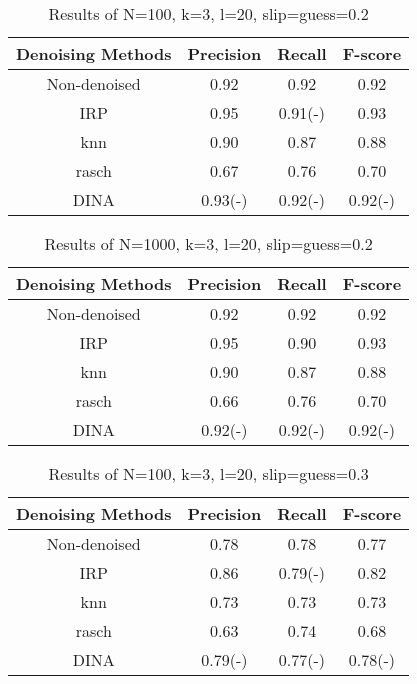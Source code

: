 \documentclass[11pt]{article}
\begin{document}
\begin{table}[!h]
\begin{center}
\begin{tabular}{|c|c|c|c|}
\hline
Denoising Methods & Precision & Recall & F-score\\
\hline
Non-denoised & 0.92 & 0.92 & 0.92  \\
\hline
IRP & 0.95 & 0.91(-) & 0.93 \\
\hline
knn & 0.90 & 0.87 & 0.88 \\
\hline
rasch & 0.67 & 0.76 & 0.70 \\
\hline
DINA & 0.93(-) & 0.92(-) & 0.92(-) \\
\hline
\end{tabular}
\end{center}
\caption{Results of N=100, k=3, l=20, slip=guess=0.2}\label{tab:results9}
\end{table}


\begin{table}[!h]
\begin{center}
\begin{tabular}{|c|c|c|c|}
\hline
Denoising Methods & Precision & Recall & F-score\\
\hline
Non-denoised & 0.92 & 0.92 & 0.92  \\
\hline
IRP & 0.95 & 0.90 & 0.93 \\
\hline
knn & 0.90 & 0.87 & 0.88 \\
\hline
rasch & 0.66 & 0.76 & 0.70 \\
\hline
DINA & 0.92(-) & 0.92(-) & 0.92(-) \\
\hline
\end{tabular}
\end{center}
\caption{Results of N=1000, k=3, l=20, slip=guess=0.2}\label{tab:results10}
\end{table}


\begin{table}[!h]
\begin{center}
\begin{tabular}{|c|c|c|c|}
\hline
Denoising Methods & Precision & Recall & F-score\\
\hline
Non-denoised & 0.78 & 0.78 & 0.77  \\
\hline
IRP & 0.86 & 0.79(-) & 0.82 \\
\hline
knn & 0.73 & 0.73 & 0.73 \\
\hline
rasch & 0.63 & 0.74 & 0.68 \\
\hline
DINA & 0.79(-) & 0.77(-) & 0.78(-) \\
\hline
\end{tabular}
\end{center}
\caption{Results of N=100, k=3, l=20, slip=guess=0.3}\label{tab:results11}
\end{table}
\end{document}
